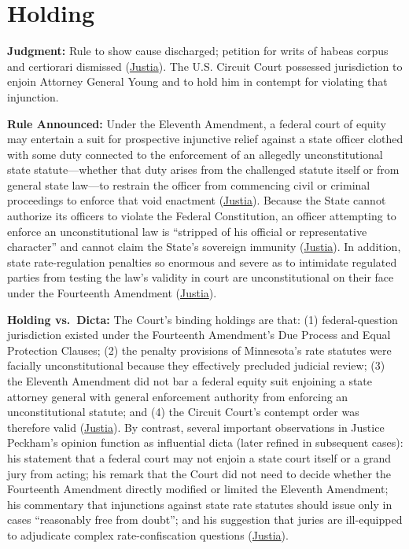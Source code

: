 \documentclass[12pt]{article}
\begin{document}
\section{Holding}

\textbf{Judgment:} Rule to show cause discharged; petition for writs of habeas corpus and certiorari dismissed (\href{https://supreme.justia.com/cases/federal/us/209/123/}{Justia}). The U.S. Circuit Court possessed jurisdiction to enjoin Attorney General Young and to hold him in contempt for violating that injunction.

\textbf{Rule Announced:} Under the Eleventh Amendment, a federal court of equity may entertain a suit for prospective injunctive relief against a state officer clothed with some duty connected to the enforcement of an allegedly unconstitutional state statute---whether that duty arises from the challenged statute itself or from general state law---to restrain the officer from commencing civil or criminal proceedings to enforce that void enactment (\href{https://supreme.justia.com/cases/federal/us/209/123/}{Justia}). Because the State cannot authorize its officers to violate the Federal Constitution, an officer attempting to enforce an unconstitutional law is ``stripped of his official or representative character'' and cannot claim the State's sovereign immunity (\href{https://supreme.justia.com/cases/federal/us/209/123/}{Justia}). In addition, state rate-regulation penalties so enormous and severe as to intimidate regulated parties from testing the law's validity in court are unconstitutional on their face under the Fourteenth Amendment (\href{https://supreme.justia.com/cases/federal/us/209/123/}{Justia}).

\textbf{Holding vs.\ Dicta:} The Court's binding holdings are that: (1) federal-question jurisdiction existed under the Fourteenth Amendment's Due Process and Equal Protection Clauses; (2) the penalty provisions of Minnesota's rate statutes were facially unconstitutional because they effectively precluded judicial review; (3) the Eleventh Amendment did not bar a federal equity suit enjoining a state attorney general with general enforcement authority from enforcing an unconstitutional statute; and (4) the Circuit Court's contempt order was therefore valid (\href{https://supreme.justia.com/cases/federal/us/209/123/}{Justia}). By contrast, several important observations in Justice Peckham's opinion function as influential dicta (later refined in subsequent cases): his statement that a federal court may not enjoin a state court itself or a grand jury from acting; his remark that the Court did not need to decide whether the Fourteenth Amendment directly modified or limited the Eleventh Amendment; his commentary that injunctions against state rate statutes should issue only in cases ``reasonably free from doubt''; and his suggestion that juries are ill-equipped to adjudicate complex rate-confiscation questions (\href{https://supreme.justia.com/cases/federal/us/209/123/}{Justia}).
\end{document}
